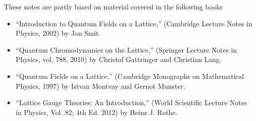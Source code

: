These notes are partly based on material covered in the following books
\begin{itemize}
    \item ``Introduction to Quantum Fields on a Lattice,'' (Cambridge Lecture Notes in Physics, 2002) by Jan Smit. 

\item``Quantum Chromodynamics on the Lattice,'' (Springer Lecture Notes in Physics, vol. 788, 2010) by Christof Gattringer and Christian Lang. 

\item ``Quantum Fields on a Lattice,'' (Cambridge Monographs on Mathematical Physics, 1997) by Istvan Montvay and Gernot Munster.  

\item ``Lattice Gauge Theories: An Introduction,'' (World Scientific Lecture Notes in Physics, Vol. 82; 4th Ed. 2012) by Heinz J. Rothe. 
\end{itemize}
